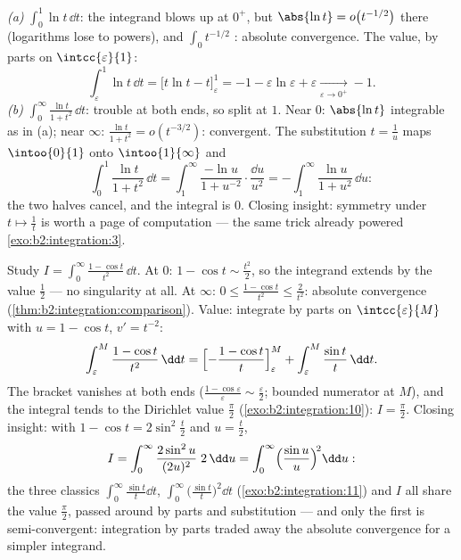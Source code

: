 \begin{example}\label{ex:b2:integration:warmups}
\emph{(a)} $\displaystyle\int_0^1 \ln t\,\dd t$: the integrand
blows up at $0^+$, but $\abs{\ln t} = o\bigl(t^{-1/2}\bigr)$
there (logarithms lose to powers), and $\int_0 t^{-1/2}$
: absolute convergence. The value, by parts on
$\intcc{\varepsilon}{1}$:
\[
\int_\varepsilon^1 \ln t\,\dd t
= \bigl[t\ln t - t\bigr]_\varepsilon^1
= -1 - \varepsilon\ln\varepsilon + \varepsilon
\xrightarrow[\varepsilon\to0^+]{} -1 .
\]
\emph{(b)} $\displaystyle\int_0^\infty \frac{\ln t}{1 +
t^2}\,\dd t$: trouble at both ends, so split at $1$. Near $0$:
$\abs{\ln t}$ integrable as in (a); near $\infty$: $\frac{\ln
t}{1+t^2} = o(t^{-3/2})$:  convergent. The
substitution $t = \frac1u$ maps $\intoo{0}{1}$ onto
$\intoo{1}{\infty}$ and
\[
\int_0^1 \frac{\ln t}{1+t^2}\,\dd t
= \int_1^{\infty} \frac{-\ln u}{1 + u^{-2}}\cdot
\frac{\dd u}{u^2}
= -\int_1^\infty \frac{\ln u}{1+u^2}\,\dd u :
\]
the two halves cancel, and the integral is $0$. Closing
insight: symmetry under $t \mapsto \frac1t$ is worth a page of
computation --- the same trick already powered
\cref{exo:b2:integration:3}.
\end{example}

\begin{example}\label{ex:b2:integration:onecos}
Study $I = \displaystyle\int_0^{\infty} \frac{1 - \cos
t}{t^2}\,\dd t$. At $0$: $1 - \cos t \sim \frac{t^2}2$, so the
integrand extends  by the value $\frac12$ --- no
singularity at all. At $\infty$: $0 \leq \frac{1 - \cos t}{t^2}
\leq \frac{2}{t^2}$: absolute convergence
(\cref{thm:b2:integration:comparison}). Value: integrate by
parts on $\intcc{\varepsilon}{M}$ with $u = 1 - \cos t$, $v' =
t^{-2}$:
\[
\int_\varepsilon^M \frac{1 - \cos t}{t^2}\,\dd t
= \Bigl[-\frac{1 - \cos t}{t}\Bigr]_\varepsilon^M
+ \int_\varepsilon^M \frac{\sin t}{t}\,\dd t .
\]
The bracket vanishes at both ends ($\frac{1 -
\cos\varepsilon}{\varepsilon} \sim \frac\varepsilon2$; bounded
numerator at $M$), and the integral tends to the Dirichlet value
$\frac\pi2$ (\cref{exo:b2:integration:10}): $I = \frac\pi2$.
Closing insight: with $1 - \cos t = 2\sin^2\frac t2$ and $u =
\frac t2$,
\[
I = \int_0^\infty \frac{2\sin^2 u}{(2u)^2}\;2\,\dd u
= \int_0^\infty \Bigl(\frac{\sin u}{u}\Bigr)^{\!2}\dd u :
\]
the three classics $\int_0^\infty\frac{\sin t}{t}\dd t$,
$\int_0^\infty\bigl(\frac{\sin t}{t}\bigr)^2\dd t$
(\cref{exo:b2:integration:11}) and $I$ all share the value
$\frac\pi2$, passed around by parts and substitution --- and
only the first is semi-convergent: integration by parts traded
away the absolute convergence for a simpler integrand.
\end{example}

